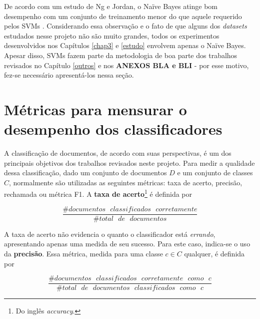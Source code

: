De acordo com um estudo de Ng e Jordan, o Naïve Bayes atinge bom desempenho com um conjunto de treinamento menor do que aquele requerido pelos SVMs \cite{ng-jordan}. Considerando essa observação e o fato de que alguns dos \emph{datasets} estudados nesse projeto não são muito grandes, todos os experimentos desenvolvidos nos Capítulos \ref{chap3} e \ref{estudo} envolvem apenas o Naïve Bayes. Apesar disso, SVMs fazem parte da metodologia de boa parte dos trabalhos revisados no Capítulo \ref{outros} e nos \textbf{ANEXOS BLA e BLI} - por esse motivo, fez-se necessário apresentá-los nessa seção.




\section{Métricas para mensurar o desempenho dos classificadores}
\label{metricas}

A classificação de documentos, de acordo com suas perspectivas, é um dos principais objetivos dos trabalhos revisados neste projeto. Para medir a qualidade dessa classificação, dado um conjunto de documentos \ensuremath{D} e um conjunto de classes \ensuremath{C}, normalmente são utilizadas as seguintes métricas: taxa de acerto, precisão, rechamada ou métrica F1. A \textbf{taxa de acerto}\footnote{Do inglês \emph{accuracy}.} é definida por \cite{manning}

\begin{equation}
\label{accuracy}
\ensuremath{\frac{\#documentos\mbox{ }classificados\mbox{ }corretamente}{\#total\mbox{ }de\mbox{ }documentos}}
\end{equation}

A taxa de acerto não evidencia o quanto o classificador está \emph{errando}, apresentando apenas uma medida de seu sucesso. Para este caso, indica-se o uso da \textbf{precisão}. Essa métrica, medida para uma classe \ensuremath{c \in C} qualquer, é definida por \cite{manning}

\begin{equation}
\label{precision}
\ensuremath{\frac{\#documentos\mbox{ }classificados\mbox{ }corretamente\mbox{ }como\mbox{ }c}{\#total\mbox{ }de\mbox{ }documentos\mbox{ }classificados\mbox{ }como\mbox{ }c}}
\end{equation}

